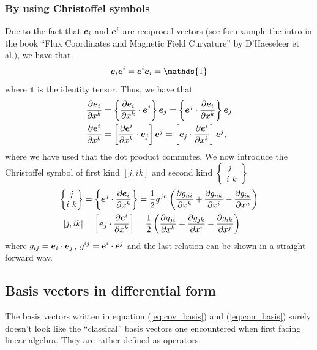 \documentclass[a4paper, 12pt]{article}
\begin{document}
\subsubsection{By using Christoffel symbols}
Due to the fact that $\boldsymbol{e}_i$ and $\boldsymbol{e}^i$ are reciprocal vectors (see for
example the intro in the book ``Flux Coordinates and Magnetic Field Curvature''
by D'Haeseleer et al.), we have that
%
\begin{align*}
 \ve{e}_i\ve{e}^i = \ve{e}^i\ve{e}_i = \mathds{1}
\end{align*}
%
where $\mathds{1}$ is the identity tensor. Thus, we have that
%
\begin{align*}
 \frac{\partial {\boldsymbol{e}_i}}{\partial{x^k}} &= \left\{\frac{\partial {\boldsymbol{e}_i}}{\partial{x^k}} \cdot \boldsymbol{e}^j\right\} \boldsymbol{e}_j
 =  \left\{\boldsymbol{e}^j \cdot \frac{\partial {\boldsymbol{e}_i}}{\partial{x^k}} \right\} \boldsymbol{e}_j\\
 \frac{\partial {\boldsymbol{e}^i}}{\partial{x^k}} &= \left[\frac{\partial {\boldsymbol{e}^i}}{\partial{x^k}} \cdot \boldsymbol{e}_j\right] \boldsymbol{e}^j
 =  \left[\boldsymbol{e}_j \cdot \frac{\partial {\boldsymbol{e}^i}}{\partial{x^k}} \right] \boldsymbol{e}^j,
\end{align*}
%
where we have used that the dot product commutes. We now introduce the
Christoffel symbol of first kind $[j, ik]$ and second kind
$
 \begin{Bmatrix}
   \,j\,\\
  i\,\,k
 \end{Bmatrix}
$
%
\begin{align*}
 \begin{Bmatrix}
   \,j\,\\
  i\,\,k
 \end{Bmatrix}
 &=  \left\{\boldsymbol{e}^j \cdot \frac{\partial {\boldsymbol{e}_i}}{\partial{x^k}} \right\}
 = \frac{1}{2}g^{jn}\left(\frac{\partial {g_{ni}}}{\partial{x^k}} + \frac{\partial {g_{nk}}}{\partial{x^i}} -
   \frac{\partial {g_{ik}}}{\partial{x^n}}\right)\\
 [j,ik]
 &=\left[\boldsymbol{e}_j \cdot \frac{\partial {\boldsymbol{e}^i}}{\partial{x^k}} \right]
 = \frac{1}{2}\left(\frac{\partial {g_{ji}}}{\partial{x^k}} + \frac{\partial {g_{jk}}}{\partial{x^i}} -
   \frac{\partial {g_{ik}}}{\partial{x^j}}\right)
\end{align*}
%
where $g_{ij}=\boldsymbol{e}_i\cdot\boldsymbol{e}_j$, $g^{ij}=\boldsymbol{e}^i\cdot\boldsymbol{e}^j$ and the
last relation can be shown in a straight forward way.






\subsection{Basis vectors in differential form}\label{sec:bvdf}
The basis vectors written in equation (\ref{eq:cov_basis}) and
(\ref{eq:con_basis}) surely doesn't look like the ``classical'' basis vectors
one encountered when first facing linear algebra. They are rather defined as
operators.
\end{document}

